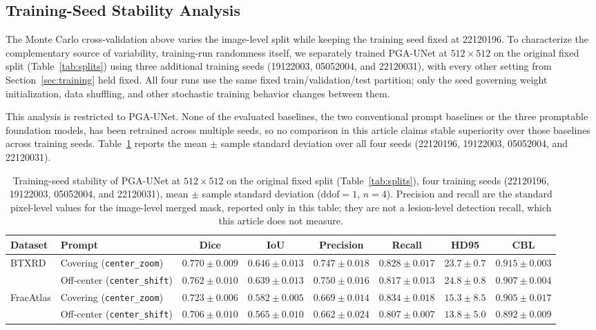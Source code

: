 \subsection{Training-Seed Stability Analysis}
\label{sec:seedstability}
The Monte Carlo cross-validation above varies the image-level split while keeping the training seed fixed at 22120196. To characterize the complementary source of variability, training-run randomness itself, we separately trained PGA-UNet at $512\times512$ on the original fixed split (Table~\ref{tab:splits}) using three additional training seeds (19122003, 05052004, and 22120031), with every other setting from Section~\ref{sec:training} held fixed. All four runs use the same fixed train/validation/test partition; only the seed governing weight initialization, data shuffling, and other stochastic training behavior changes between them.

This analysis is restricted to PGA-UNet. None of the evaluated baselines, the two conventional prompt baselines or the three promptable foundation models, has been retrained across multiple seeds, so no comparison in this article claims stable superiority over those baselines across training seeds. Table~\ref{tab:seedstability} reports the mean $\pm$ sample standard deviation over all four seeds (22120196, 19122003, 05052004, and 22120031).

\begin{table}[t]
\caption{Training-seed stability of PGA-UNet at $512\times512$ on the original fixed split (Table~\ref{tab:splits}), four training seeds (22120196, 19122003, 05052004, and 22120031), mean $\pm$ sample standard deviation ($\mathrm{ddof}=1$, $n=4$). Precision and recall are the standard pixel-level values for the image-level merged mask, reported only in this table; they are not a lesion-level detection recall, which this article does not measure.}
\label{tab:seedstability}
\centering
\scriptsize
\begin{tabular}{llcccccc}
\toprule
Dataset & Prompt & Dice & IoU & Precision & Recall & HD95 & CBL \\
\midrule
\multirow{2}{*}{BTXRD}
& Covering (\texttt{center\_zoom}) & $0.770\pm0.009$ & $0.646\pm0.013$ & $0.747\pm0.018$ & $0.828\pm0.017$ & $23.7\pm0.7$ & $0.915\pm0.003$ \\
& Off-center (\texttt{center\_shift}) & $0.762\pm0.010$ & $0.639\pm0.013$ & $0.750\pm0.016$ & $0.817\pm0.013$ & $24.8\pm0.8$ & $0.907\pm0.004$ \\
\midrule
\multirow{2}{*}{FracAtlas}
& Covering (\texttt{center\_zoom}) & $0.723\pm0.006$ & $0.582\pm0.005$ & $0.669\pm0.014$ & $0.834\pm0.018$ & $15.3\pm8.5$ & $0.905\pm0.017$ \\
& Off-center (\texttt{center\_shift}) & $0.706\pm0.010$ & $0.565\pm0.010$ & $0.662\pm0.024$ & $0.807\pm0.007$ & $13.8\pm5.0$ & $0.892\pm0.009$ \\
\bottomrule
\end{tabular}
\end{table}

